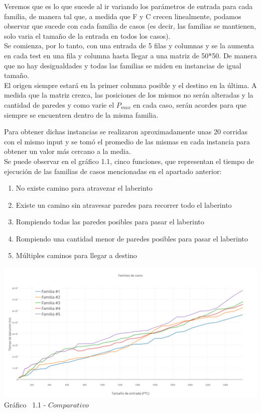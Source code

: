 \indent Veremos que es lo que sucede al ir variando los parámetros de entrada para cada familia, de manera tal que, a medida que F y C crecen linealmente, podamos observar que sucede con cada familia de casos (es decir, las familias se mantienen, solo varia el tamaño de la entrada en todos los casos).\\
Se comienza, por lo tanto, con una entrada de 5 filas y columnas y se la aumenta en cada test en una fila y columna hasta llegar a una matriz de 50*50. De manera que no hay desigualdades y todas las familias se miden en instancias de igual tamaño.\\
El origen siempre estará en la primer columna posible y el destino en la última. A medida que la matriz crezca, las posiciones de los mismos no serán alteradas y la cantidad de paredes y como varie el $P_{max}$ en cada caso, serán acordes para que siempre se encuentren dentro de la misma familia.

Para obtener dichas instancias se realizaron aproximadamente unas 20 corridas con el mismo input y se tom\'o el promedio de las mismas en cada instancia para obtener un valor m\'as cercano a la media.\\ 

Se puede observar en el  gráfico 1.1, cinco funciones, que representan el tiempo de ejecuci\'on de las familias de casos mencionadas en el apartado anterior:\\

\begin{enumerate}
\item No existe camino para atravezar el laberinto
\item Existe un camino sin atravesar paredes para recorrer todo el laberinto
\item Rompiendo todas las paredes posibles para pasar el laberinto
\item Rompiendo una cantidad menor de paredes posibles para pasar el laberinto
\item Múltiples caminos para llegar a destino
\end{enumerate}

\vspace*{0.3cm} \vspace*{0.3cm}
  \begin{center}
 \includegraphics[scale=0.4]{./EJ1/comparativo.png}
 {Gr\'afico \ 1.1 - $Comparativo$}
  \end{center}
  \vspace*{0.3cm}
  
